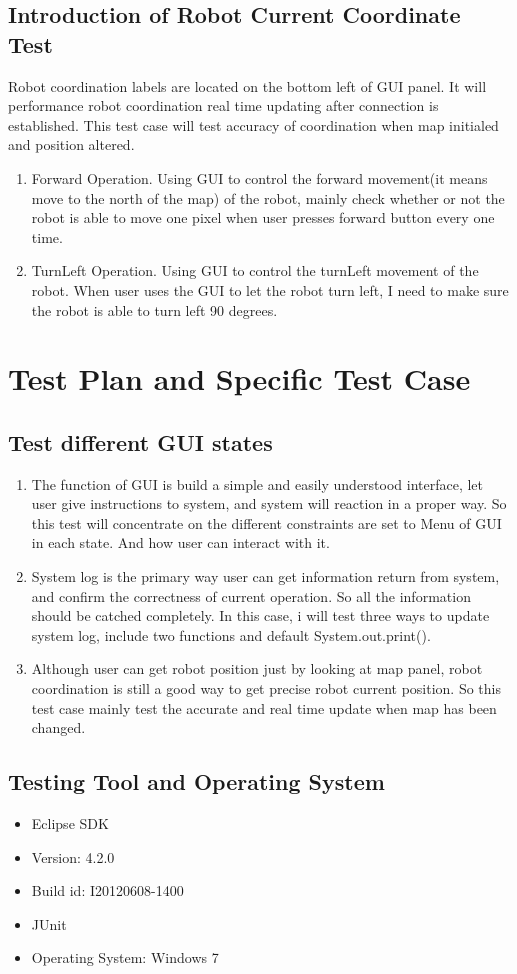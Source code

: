 \documentclass[11pt, a4paper]{report}
\begin{document}
\section{Introduction of Robot Current Coordinate Test}
Robot coordination labels are located on the bottom left of GUI panel. It will performance robot coordination real time updating after connection is established. This test case will test accuracy of coordination when map initialed and position altered.
\begin{enumerate}
\item Forward Operation. Using GUI to control the forward movement(it means move to the north of the map) of the robot, mainly check whether or not the robot is able to move one pixel when user presses forward button every one time.
\item TurnLeft Operation. Using GUI to control the turnLeft movement of the robot. When user uses the GUI to let the robot turn left, I need to make sure the robot is able to turn left 90 degrees.
\end{enumerate}
\chapter{Test Plan and Specific Test Case}
\section{Test different GUI states}
\begin{enumerate}
\item The function of GUI is build a simple and easily understood interface, let user give instructions to system, and system will reaction in a proper way. So this test will concentrate on the different constraints are set to Menu of GUI in each state. And how user can interact with it.
\item System log is the primary way user can get information return from system, and confirm the correctness of current operation. So all the information should be catched completely. In this case, i will test three ways to update system log, include two functions and default System.out.print().
\item Although user can get robot position just by looking at map panel, robot coordination is still a good way to get precise robot current position. So this test case mainly test the accurate and real time update when map has been changed.

\end{enumerate}
\section{Testing Tool and Operating System}
\begin{itemize}
\item Eclipse SDK
\item Version: 4.2.0
\item Build id: I20120608-1400
\item JUnit
\item Operating System: Windows 7
\end{itemize}
\end{document}
